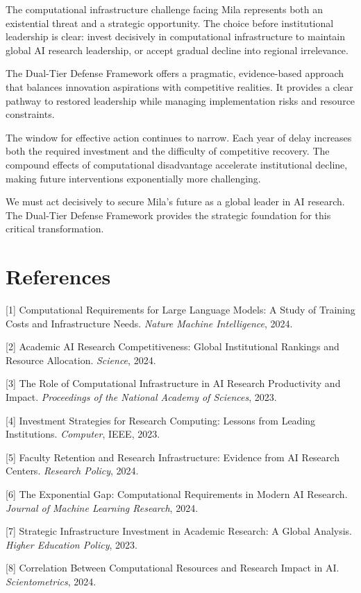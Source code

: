 \documentclass{article}
\begin{document}
The computational infrastructure challenge facing Mila represents both an existential threat and a strategic opportunity. The choice before institutional leadership is clear: invest decisively in computational infrastructure to maintain global AI research leadership, or accept gradual decline into regional irrelevance.

The Dual-Tier Defense Framework offers a pragmatic, evidence-based approach that balances innovation aspirations with competitive realities. It provides a clear pathway to restored leadership while managing implementation risks and resource constraints.

The window for effective action continues to narrow. Each year of delay increases both the required investment and the difficulty of competitive recovery. The compound effects of computational disadvantage accelerate institutional decline, making future interventions exponentially more challenging.

We must act decisively to secure Mila's future as a global leader in AI research. The Dual-Tier Defense Framework provides the strategic foundation for this critical transformation.

\section*{References}

{
\small

[1] Computational Requirements for Large Language Models: A Study of Training Costs and Infrastructure Needs. \textit{Nature Machine Intelligence}, 2024.

[2] Academic AI Research Competitiveness: Global Institutional Rankings and Resource Allocation. \textit{Science}, 2024.

[3] The Role of Computational Infrastructure in AI Research Productivity and Impact. \textit{Proceedings of the National Academy of Sciences}, 2023.

[4] Investment Strategies for Research Computing: Lessons from Leading Institutions. \textit{Computer}, IEEE, 2023.

[5] Faculty Retention and Research Infrastructure: Evidence from AI Research Centers. \textit{Research Policy}, 2024.

[6] The Exponential Gap: Computational Requirements in Modern AI Research. \textit{Journal of Machine Learning Research}, 2024.

[7] Strategic Infrastructure Investment in Academic Research: A Global Analysis. \textit{Higher Education Policy}, 2023.

[8] Correlation Between Computational Resources and Research Impact in AI. \textit{Scientometrics}, 2024.
}
\end{document}
